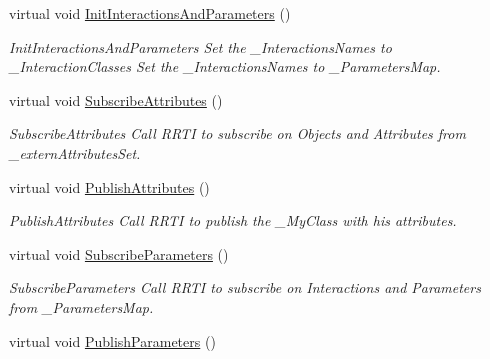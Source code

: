 \begin{DoxyCompactItemize}
\mbox{\label{classUPIM_1_1UPIMFederate_a620ab8eae270a4f3a6caad9293d91ebc}} 
virtual void \hyperlink{classUPIM_1_1UPIMFederate_a620ab8eae270a4f3a6caad9293d91ebc}{Init\+Interactions\+And\+Parameters} ()
\begin{DoxyCompactList}\small\item\em Init\+Interactions\+And\+Parameters Set the \+\_\+\+Interactions\+Names to \+\_\+\+Interaction\+Classes Set the \+\_\+\+Interactions\+Names to \+\_\+\+Parameters\+Map. \end{DoxyCompactList}\item 
\mbox{\label{classUPIM_1_1UPIMFederate_a7ca24702a958bf7a7acd4f1b8eed57f3}} 
virtual void \hyperlink{classUPIM_1_1UPIMFederate_a7ca24702a958bf7a7acd4f1b8eed57f3}{Subscribe\+Attributes} ()
\begin{DoxyCompactList}\small\item\em Subscribe\+Attributes Call R\+R\+TI to subscribe on Objects and Attributes from \+\_\+extern\+Attributes\+Set. \end{DoxyCompactList}\item 
\mbox{\label{classUPIM_1_1UPIMFederate_aa9ab70b2ea6aa6873bb92488b7f8e930}} 
virtual void \hyperlink{classUPIM_1_1UPIMFederate_aa9ab70b2ea6aa6873bb92488b7f8e930}{Publish\+Attributes} ()
\begin{DoxyCompactList}\small\item\em Publish\+Attributes Call R\+R\+TI to publish the \+\_\+\+My\+Class with his attributes. \end{DoxyCompactList}\item 
\mbox{\label{classUPIM_1_1UPIMFederate_a8d7175deddb56a8afc8c328b152071c0}} 
virtual void \hyperlink{classUPIM_1_1UPIMFederate_a8d7175deddb56a8afc8c328b152071c0}{Subscribe\+Parameters} ()
\begin{DoxyCompactList}\small\item\em Subscribe\+Parameters Call R\+R\+TI to subscribe on Interactions and Parameters from \+\_\+\+Parameters\+Map. \end{DoxyCompactList}\item 
\mbox{\label{classUPIM_1_1UPIMFederate_a0a333644c8a14d5bc7bdda945b769621}} 
virtual void \hyperlink{classUPIM_1_1UPIMFederate_a0a333644c8a14d5bc7bdda945b769621}{Publish\+Parameters} ()

\end{DoxyCompactItemize}
